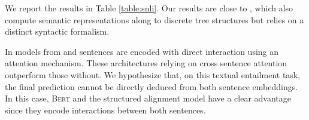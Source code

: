 We report the results in Table \ref{table:snli}. Our results are close to \textcite{choi_18}, which also compute semantic representations along to discrete tree structures but relies on a distinct syntactic formalism. 

In models from \textcite{liu_18} and \textcite{zhang_20} sentences are encoded with direct interaction using an attention mechanism. These architectures relying on cross sentence attention outperform those without.
We hypothesize that, 
on this textual entailment task, the final prediction cannot be directly deduced from both sentence embeddings. In this case, \textsc{Bert} and the structured alignment model have a clear advantage since they encode interactions between both sentences.








